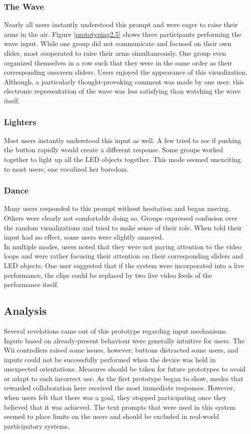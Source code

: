 \subsubsection{The Wave}
Nearly all users instantly understood this prompt and were eager to raise their arms in the air. Figure \ref{prototyping2.5} shows three participants performing the wave input. While one group did not communicate and focused on their own slider, most cooperated to raise their arms simultaneously. One group even organized themselves in a row such that they were in the same order as their corresponding onscreen sliders. Users enjoyed the appearance of this visualization. Although, a particularly thought-provoking comment was made by one user: this electronic representation of the wave was less satisfying than watching the wave itself.

\subsubsection{Lighters}
Most users instantly understood this input as well. A few tried to see if pushing the button rapidly would create a different response. Some groups worked together to light up all the LED objects together. This mode seemed unexciting to most users; one vocalized her boredom.

\subsubsection{Dance}
Many users responded to this prompt without hesitation and began moving. Others were clearly not comfortable doing so. Groups expressed confusion over the random visualizations and tried to make sense of their role. When told their input had no effect, some users were slightly annoyed.\\

\noindent
In multiple modes, users noted that they were not paying attention to the video loops and were rather focusing their attention on their corresponding sliders and LED objects. One user suggested that if the system were incorporated into a live performance, the clips could be replaced by two live video feeds of the performance itself.

\subsection{Analysis}

Several revelations came out of this prototype regarding input mechanisms. Inputs based on already-present behaviour were generally intuitive for users. The Wii controllers raised some issues, however; buttons distracted some users, and inputs could not be successfully performed when the device was held in unexpected orientations. Measures should be taken for future prototypes to avoid or adapt to such incorrect use. As the first prototype began to show, modes that rewarded collaboration here received the most immediate responses. However, when users felt that there was a goal, they stopped participating once they believed that it was achieved. The text prompts that were used in this system seemed to place limits on the users and should be excluded in real-world participatory systems.


